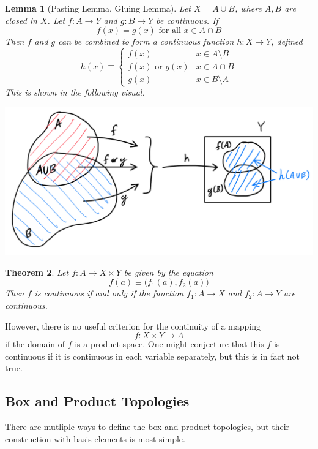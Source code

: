 \documentclass{article}
\newtheorem{theorem}{Theorem}[section]
\newtheorem{lemma}[theorem]{Lemma}
\theoremstyle{remark}
\theoremstyle{definition}
\begin{document}
\begin{lemma}[Pasting Lemma, Gluing Lemma]
Let $X = A \cup B$, where $A, B$ are closed in $X$. Let $f: A \longrightarrow Y$ and $g: B \longrightarrow Y$ be continuous. If 
\[f(x) = g(x) \text{ for all } x \in A \cap B\]
Then $f$ and $g$ can be combined to form a continuous function $h: X \longrightarrow Y$, defined
\[h(x) \equiv \begin{cases}
      f(x) & x \in A \setminus B \\
      f(x) \text{ or } g(x) & x \in A \cap B \\
      g(x) & x \in B \setminus A
\end{cases}\]
This is shown in the following visual. 
\begin{center}
    \includegraphics[scale=0.25]{img/Gluing_Lemma.PNG}
\end{center}
\end{lemma}

\begin{theorem}
Let $f: A \longrightarrow X \times Y$ be given by the equation 
\[f(a) \equiv \big( f_1 (a), f_2(a) \big)\]
Then $f$ is continuous if and only if the function $f_1: A \longrightarrow X$ and $f_2: A \longrightarrow Y$ are continuous. 
\end{theorem}

However, there is no useful criterion for the continuity of a mapping 
\[f: X \times Y \longrightarrow A\]
if the domain of $f$ is a product space. One might conjecture that this $f$ is continuous if it is continuous in each variable separately, but this is in fact not true. 

\subsection{Box and Product Topologies}

There are mutliple ways to define the box and product topologies, but their construction with basis elements is most simple. 
\end{document}
